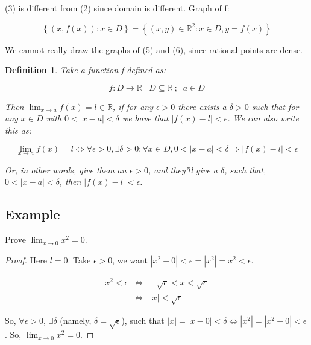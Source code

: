 \message{ !name(RealAnalysis.tex)}\documentclass[12pt]{scrbook}
\newtheorem*{definition}{Definition}
\begin{document}
(3) is different from (2) since domain is different. Graph of f:

\[ \left\{ (x, f(x)) : x \in D \right\}  =  \left\{ (x, y) \in \mathbb{R}^2 :  x \in D, y = f(x) \right\} \]

We cannot really draw the graphs of (5) and (6), since rational points are dense.

\begin{definition}

Take a function f defined as:

\[ f : D \rightarrow \mathbb{R} \;\;\; D \subseteq \mathbb{R} \ ;\;\; a \in D \]

Then 
$\lim_{x \to a} f(x) = l \in \mathbb{R}$, if for any $\epsilon > 0$  there exists a $\delta > 0$ such that for any $x \in D$ with
$0 < |x - a| < \delta$ we have that $| f(x) - l | < \epsilon $.
We can also write this as:

\[ \lim_{x \to a} f(x) = l \iff \forall \epsilon > 0,  \exists \delta > 0: \forall x \in D, 0 < | x - a | < \delta \Rightarrow | f(x) - l | < \epsilon \]

Or, in other words, give them an $\epsilon > 0$, and they'll give a $\delta$, such that, $0 < |x - a| < \delta$, then $| f(x) - l | < \epsilon $.
\end{definition}

\subsection{Example}

Prove $\lim_{x \to 0} x^2 = 0$.

\hspace{5cm}


\begin{proof}

Here $l = 0$.  Take $\epsilon > 0$, we want $ \left | x^2 - 0 \right | < \epsilon = \left | x^2 \right | = x^2 < \epsilon$.

\begin{eqnarray*}
x^2 < \epsilon &\Leftrightarrow&  -\sqrt{\epsilon} < x < \sqrt{\epsilon} \\
&\Leftrightarrow& |x| < \sqrt{\epsilon} 
\end{eqnarray*}

So, $\forall \epsilon > 0$, $\exists \delta$ (namely, $\delta = \sqrt{\epsilon}$), such that $|x| = |x - 0| < \delta \Leftrightarrow |x^2| = |x^2 - 0| < \epsilon$. So, $\lim_{x \to 0} x^2 = 0$.
\end{proof}
\end{document}
